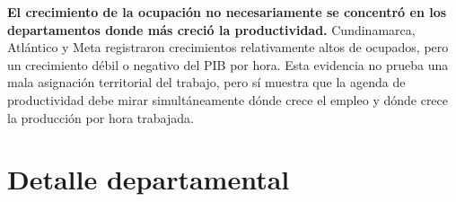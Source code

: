 \documentclass[12pt, a4paper]{article}
\begin{document}
\begin{mdframed}[
  linewidth=1pt,
  linecolor=gray!60,
  backgroundcolor=gray!6,
  innertopmargin=12pt,
  innerbottommargin=12pt,
  innerleftmargin=14pt,
  innerrightmargin=14pt
]
\textbf{El crecimiento de la ocupación no necesariamente se concentró en los departamentos donde más creció la productividad.} Cundinamarca, Atlántico y Meta registraron crecimientos relativamente altos de ocupados, pero un crecimiento débil o negativo del PIB por hora. Esta evidencia no prueba una mala asignación territorial del trabajo, pero sí muestra que la agenda de productividad debe mirar simultáneamente dónde crece el empleo y dónde crece la producción por hora trabajada.
\end{mdframed}

\newpage
\tableofcontents
\newpage



\appendix
\section{Detalle departamental}


%
%
\end{document}
